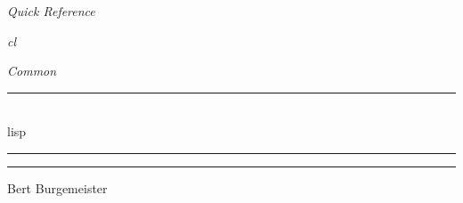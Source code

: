\documentclass[8pt,pagesize,twoside,footexclude,headexclude]{scrartcl}
\begin{document}
\newlength{\titlepagewidth}
\setlength{\titlepagewidth}{8cm}
\begin{titlepage}
  \renewcommand{\rmdefault}{ptm} %
  \vspace*{15mm}
  \begin{center}
    \begin{minipage}{\titlepagewidth}
      \begin{center}
        \rmfamily\mdseries\itshape\fontsize{20}{0}\selectfont
        Quick Reference\\
      \end{center}
    \end{minipage}
    \vfill
    \begin{minipage}{\titlepagewidth}
      \begin{center}
        \rmfamily\mdseries\itshape\fontsize{300}{0}\selectfont%
                                           {\color{lightgray}cl\/}\\
      \end{center}
    \end{minipage}
    \vfill
    \begin{minipage}{\titlepagewidth}
      \rmfamily\mdseries\itshape\fontsize{36}{0}\selectfont
      \hfill Common\/\\[2mm]
      \rmfamily\mdseries\upshape\fontsize{157}{0}\selectfont
      \rule[3mm]{\textwidth}{1.5mm}\\
      lisp\\[-10mm]
      \rule[15mm]{5.5cm}{1.5mm}\hfill\rule[15mm]{1.77cm}{1.5mm}
    \end{minipage}
    \begin{minipage}{\titlepagewidth}
      \rmfamily\mdseries\upshape\fontsize{14}{0}\selectfont
      Bert Burgemeister
      \vspace*{4mm}
    \end{minipage}
  \end{center}

\end{titlepage}

\end{document}
